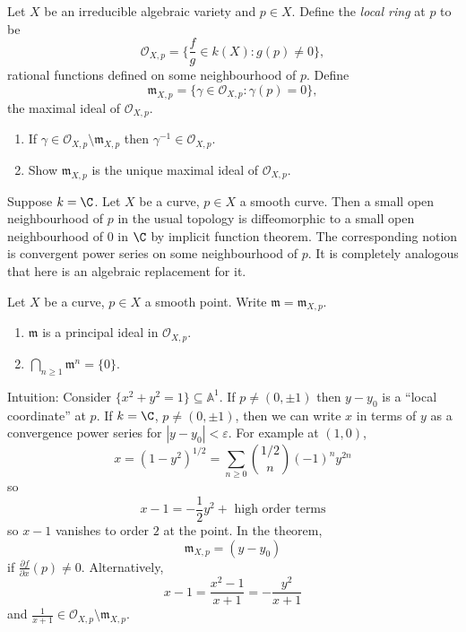 \documentclass[a4paper]{article}
\renewcommand{\A}{\mathbb{A}}
\begin{document}
\begin{definition}
  Let \(X\) be an irreducible algebraic variety and \(p \in X\). Define the \emph{local ring} at \(p\) to be
  \[
    \mathcal O_{X, p} = \{\frac{f}{g} \in k(X): g(p) \neq 0\},
  \]
  rational functions defined on some neighbourhood of \(p\). Define
  \[
    \mathfrak m_{X, p} = \{\gamma \in \mathcal O_{X, p}: \gamma(p) = 0\},
  \]
  the maximal ideal of \(\mathcal O_{X, p}\).
\end{definition}

\begin{ex}\leavevmode
  \begin{enumerate}
  \item If \(\gamma \in \mathcal O_{X, p} \setminus \mathfrak m_{X, p}\) then \(\gamma^{-1} \in \mathcal O_{X, p}\).
  \item Show \(\mathfrak m_{X, p}\) is the unique maximal ideal of \(\mathcal O_{X, p}\).
  \end{enumerate}
\end{ex}

Suppose \(k = \C\). Let \(X\) be a curve, \(p \in X\) a smooth curve. Then a small open neighbourhood of \(p\) in the usual topology is diffeomorphic to a small open neighbourhood of \(0\) in \(\C\) by implicit function theorem. The corresponding notion is convergent power series on some neighbourhood of \(p\). It is completely analogous that here is an algebraic replacement for it.

\begin{theorem}
  Let \(X\) be a curve, \(p \in X\) a smooth point. Write \(\mathfrak m = \mathfrak m_{X, p}\).
  \begin{enumerate}
  \item \(\mathfrak m\) is a principal ideal in \(\mathcal O_{X, p}\).
  \item \(\bigcap_{n \geq 1} \mathfrak m^n = \{0\}\).
  \end{enumerate}
\end{theorem}

\begin{eg}
  Intuition: Consider \(\{x^2 + y^2 = 1\} \subseteq \A^1\). If \(p \neq (0, \pm 1)\) then \(y - y_0\) is a ``local coordinate'' at \(p\). If \(k = \C\), \(p \neq (0, \pm 1)\), then we can write \(x\) in terms of \(y\) as a convergence power series for \(|y - y_0| < \varepsilon\). For example at \((1, 0)\),
  \[
    x
    = (1 - y^2)^{1/2}
    = \sum_{n \geq 0} \binom{1/2}{n} (-1)^n y^{2n}
  \]
  so
  \[
    x - 1 = -\frac{1}{2}y^2 + \text{ high order terms}
  \]
  so \(x - 1\) vanishes to order \(2\) at the point. In the theorem,
  \[
    \mathfrak m_{X, p} = (y - y_0)
  \]
  if \(\frac{\partial f}{\partial x}(p) \neq 0\). Alternatively,
  \[
    x - 1
    = \frac{x^2 - 1}{x + 1}
    = -\frac{y^2}{x + 1}
  \]
  and \(\frac{1}{x + 1} \in \mathcal O_{X, p} \setminus \mathfrak m_{X, p}\).
\end{eg}
\end{document}
